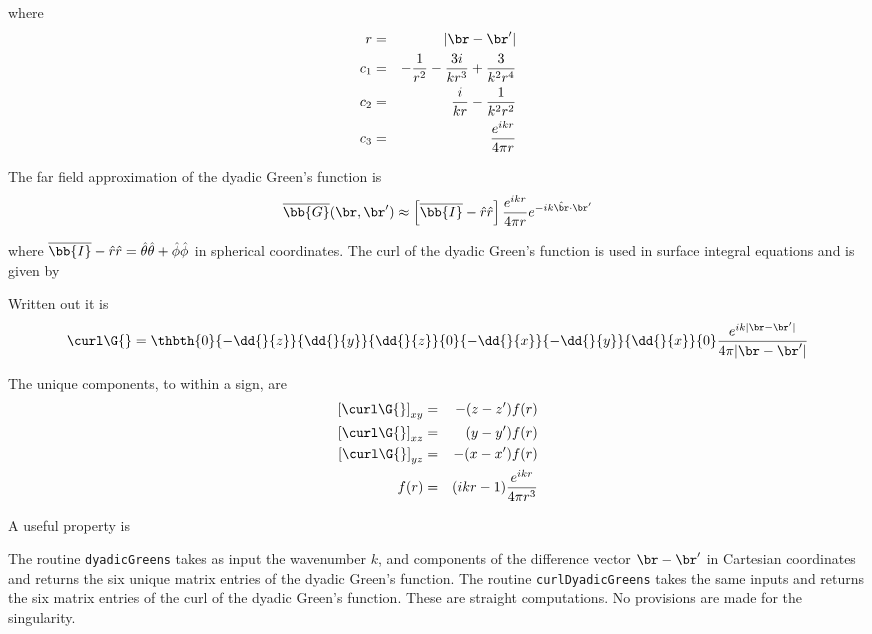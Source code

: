 \noindent where
\begin{eqnarray}
r &=& \vert \br - \br' \vert \\
c_1 &=& -\dfrac{1}{r^2} - \dfrac{3i}{k r^3} + \dfrac{3}{k^2 r^4} \\
c_2 &=& \dfrac{i}{kr} - \dfrac{1}{k^2r^2} \\
c_3 &=& \dfrac{e^{ikr}}{4\pi r}
\end{eqnarray}

The far field approximation of the dyadic Green's function is 
\begin{equation} \overline{\bb{G}}(\br,\br') \approx \left[\overline{\bb{I}} - \hat{r}\hat{r}\right] \dfrac{e^{ikr}}{4\pi r} e^{-ik \hat{\br}\cdot\br' \label{dyadicGff}} 
 \end{equation}
 
\noindent where $\overline{\bb{I}} - \hat{r}\hat{r} = \hat{\theta}\hat{\theta} + \hat{\phi}\hat{\phi}$ in spherical coordinates.  The curl of the dyadic Green's function is used in surface integral equations and is given by 

Written out it is 
\begin{equation}
\curl \G{} = \thbth
{0}{-\dd{}{z} } {\dd{}{y} } 
{\dd{}{z} } {0} {-\dd{}{x}}
{-\dd{}{y} } {\dd{}{x}} {0}
\dfrac{e^{ik\vert \br - \br' \vert}}{4\pi   \vert \br - \br' \vert}
\end{equation}



The unique components, to within a sign, are 
\begin{eqnarray}
\left[\curl \G{}\right]_{xy}  &=& -(z-z') f(r) \\
\left[\curl \G{}\right]_{xz}&=& (y-y') f(r) \\ 
\left[\curl \G{}\right]_{yz}&=& - (x-x') f(r) \\
f(r) &=& (i k r-1) \dfrac{e^{i k r}}{4 \pi r^3} 
\end{eqnarray}

A useful property is

\clearpage
\newpage
The routine \texttt{dyadicGreens} takes as input the wavenumber $k$, and components of the difference vector $\br - \br'$ in Cartesian coordinates and returns the six unique matrix entries of the dyadic Green's function.  The routine \texttt{curlDyadicGreens} takes the same inputs and returns the six matrix entries of the curl of the dyadic Green's function. These are straight computations. No provisions are made for the singularity.  

